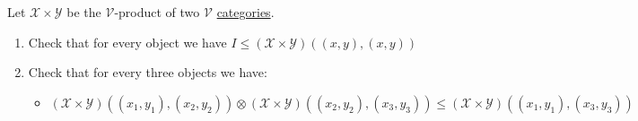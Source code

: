 Let $\mathcal{X} \times \mathcal{Y}$ be the $\mathcal{V}$-product of two $\mathcal{V}$ \href{doc/1 math/Seven Sketches in Compositionality/Chapter 2: Resource theories/3 Enrichment/1 V-categories/1 V-category}{categories}.
    \begin{enumerate}
      \item Check that for every object we have $I \leq (\mathcal{X} \times \mathcal{Y})((x,y),(x,y))$
      \item Check that for every three objects we have:
            \begin{itemize}
              \item $(\mathcal{X} \times \mathcal{Y})((x_1,y_1),(x_2,y_2)) \otimes (\mathcal{X} \times \mathcal{Y})((x_2,y_2),(x_3,y_3)) \leq (\mathcal{X} \times \mathcal{Y})((x_1,y_1),(x_3,y_3))$
            \end{itemize}
    \end{enumerate}